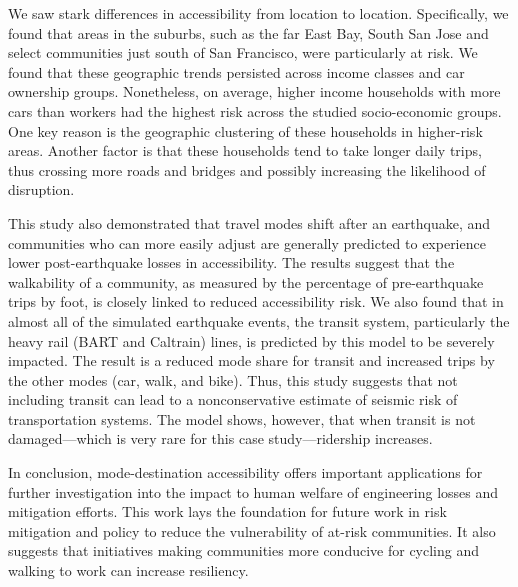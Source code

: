 
We saw stark differences in accessibility from location to location. Specifically, we found that areas in the suburbs, such as the far East Bay, South San Jose and select communities just south of San Francisco, were particularly at risk. We found that these geographic trends persisted across income classes and car ownership groups. Nonetheless, on average, higher income households with more cars than workers had the highest risk across the studied socio-economic groups. One key reason is the geographic clustering of these households in higher-risk areas. Another factor is that these households tend to take longer daily trips, thus crossing more roads and bridges and possibly increasing the likelihood of disruption.

This study also demonstrated that travel modes shift after an earthquake, and communities who can more easily adjust are generally predicted to experience lower post-earthquake losses in accessibility. The results suggest that the walkability of a community, as measured by the percentage of pre-earthquake trips by foot, is closely linked to reduced accessibility risk. 
We also found that in almost all of the simulated earthquake events, the transit system, particularly the heavy rail (BART and Caltrain) lines, is predicted by this model to be severely impacted. The result is a reduced mode share for transit and increased trips by the other modes (car, walk, and bike). Thus, this study suggests that not including transit can lead to a nonconservative estimate of seismic risk of transportation systems. The model shows, however, that when transit is not damaged---which is very rare for this case study---ridership increases.

In conclusion,  mode-destination accessibility offers important applications for further investigation into the impact to human welfare of engineering losses and mitigation efforts. 
This work lays the foundation for future work in risk mitigation and policy to reduce the vulnerability of at-risk communities. It also suggests that initiatives making communities more conducive for cycling and walking to work can increase resiliency.

